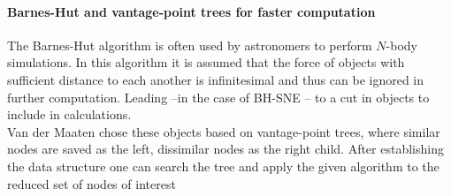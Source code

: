 \documentclass[twocolumn]{bmcart}%
\begin{document}
\paragraph*{Barnes-Hut and vantage-point trees for faster computation}
The Barnes-Hut algorithm is often used by astronomers to perform $N$-body simulations\cite{DBLP:journals/corr/abs-1301-3342}. In this algorithm it is assumed that the force of objects with sufficient distance to each another is infinitesimal and thus can be ignored in further computation. Leading --in the case of BH-SNE -- to a cut in objects to include in calculations.\\
Van der Maaten chose these objects based on vantage-point trees, where similar nodes are saved as the left, dissimilar nodes as the right child. After establishing the data structure one can search the tree and apply the given algorithm to the reduced set of nodes of interest\\
\end{document}
